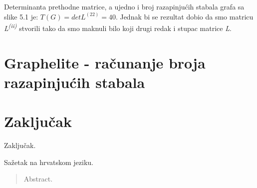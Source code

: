 \documentclass[times, utf8, zavrsni]{fer}
\begin{document}
Determinanta prethodne matrice, a ujedno i broj razapinjućih stabala grafa sa slike 5.1 je: $T(G) = det L^{(22)} = 40$. Jednak bi se rezultat dobio da smo matricu \textit{L\textsuperscript{(ii)}} stvorili tako da smo maknuli bilo koji drugi redak i stupac matrice \textit{L}.

\chapter{Graphelite - računanje broja razapinjućih stabala}

\chapter{Zaključak}
Zaključak.




\begin{sazetak}
Sažetak na hrvatskom jeziku.

\end{sazetak}

\begin{abstract}
Abstract.

\end{abstract}
\end{document}
